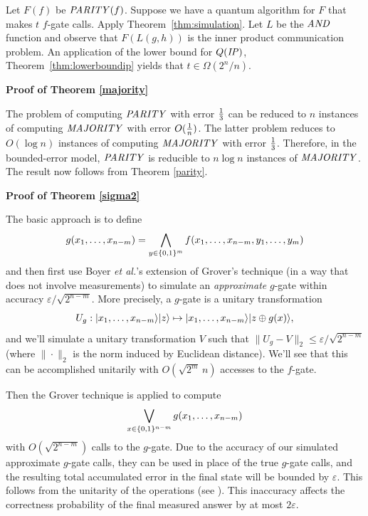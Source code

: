 Let $F(f)$ be $\mbox{\it PARITY\/}(f)$. Suppose we have a quantum algorithm for
$F$ that makes $t$ $f$-gate calls. Apply Theorem~\ref{thm:simulation}.
Let $L$ be the $\mbox{\it AND\/}$ function and observe that $F(L(g,h))$ is the inner 
product communication problem.  An application of the lower bound for 
$Q(\mbox{\it IP\/})$, Theorem~\ref{thm:lowerboundip} yields that $t \in \Omega(2^n/n)$.\ee

\noindent
{\bf Proof of Theorem \ref{majority}}

The problem of computing $\mbox{\it PARITY\/}$ with error $1 \over 3$ can be reduced 
to $n$ instances of computing $\mbox{\it MAJORITY\/}$ with error $O({1 \over n})$.
The latter problem reduces to $O(\log n)$ instances of computing $\mbox{\it MAJORITY\/}$ 
with error $1 \over 3$.
Therefore, in the bounded-error model, $\mbox{\it PARITY\/}$ is reducible to 
$n \log n$ instances of $\mbox{\it MAJORITY\/}$.
The result now follows from Theorem \ref{parity}.\ee

\noindent
{\bf Proof of Theorem \ref{sigma2}}

The basic approach is to define
\begin{equation}
g(x_1,\ldots,x_{n-m}) = 
\bigwedge_{y \in \01^m} f(x_1,\ldots,x_{n-m},y_1,\ldots,y_m)
\end{equation}
and then first use Boyer {\it et al.}'s \cite{BBHT96} extension of 
Grover's technique \cite{Gr96} (in a way that does not involve measurements) 
to simulate an {\em approximate} $g$-gate within accuracy 
$\varepsilon / \sqrt{2^{n-m}}$.
More precisely, a $g$-gate is a unitary transformation
\begin{equation}
U_g : \mbox{$| x_1,\ldots,x_{n-m} \rangle$}\mbox{$| z \rangle$} \mapsto 
\mbox{$| x_1,\ldots,x_{n-m} \rangle$}\mbox{$| z \oplus g(x) \rangle$}, 
\end{equation}
and we'll simulate a unitary transformation $V$ such that 
$\| U_g - V \|_2 \le \varepsilon / \sqrt{2^{n-m}}$ (where $\| \cdot \|_2$ 
is the norm induced by Euclidean distance).
We'll see that this can be accomplished unitarily with $O(\sqrt{2^m}\,n)$ 
accesses to the $f$-gate.

Then the Grover technique is applied to compute 
\begin{equation}
\bigvee_{x \in \01^{n-m}} g(x_1,\ldots,x_{n-m})
\end{equation}
 with $O(\sqrt{2^{n-m}})$ 
calls to the $g$-gate.
Due to the accuracy of our simulated approximate $g$-gate calls, 
they can be used in place of the true $g$-gate calls, and the resulting 
total accumulated error in the final state will be bounded by $\varepsilon$.
This follows from the unitarity of the operations (see \cite{BBBV93}).
This inaccuracy affects the correctness probability of the final measured 
answer by at most $2 \varepsilon$.

